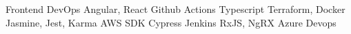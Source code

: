 

\begin{center}
\begin{skills}
                       {Frontend}              {DevOps}
              {Angular, React}        {Github Actions}
         {Typescript}            {Terraform, Docker}
              {Jasmine, Jest, Karma}  {AWS SDK}
       {Cypress}               {Jenkins}
                {RxJS, NgRX}            {Azure Devops}
\end{skills}
\end{center}